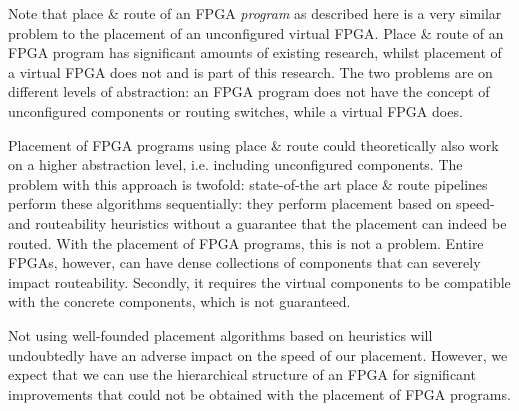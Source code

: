 \begin{minipage}{\textwidth}
\begin{important}
Note that place \& route of an FPGA \textit{program} as described here is a very similar problem to the placement of an unconfigured virtual FPGA. Place \& route of an FPGA program has significant amounts of existing research, whilst placement of a virtual FPGA does not and is part of this research. The two problems are on different levels of abstraction: an FPGA program does not have the concept of unconfigured components or routing switches, while a virtual FPGA does.

Placement of FPGA programs using place \& route could theoretically also work on a higher abstraction level, i.e. including unconfigured components. The problem with this approach is twofold: state-of-the art place \& route pipelines perform these algorithms sequentially: they perform placement based on speed- and routeability heuristics without a guarantee that the placement can indeed be routed\cite{alhyari2019}. With the placement of FPGA programs, this is not a problem. Entire FPGAs, however, can have dense collections of components that can severely impact routeability. Secondly, it requires the virtual components to be compatible with the concrete components, which is not guaranteed.

Not using well-founded placement algorithms based on heuristics will undoubtedly have an adverse impact on the speed of our placement. However, we expect that we can use the hierarchical structure of an FPGA for significant improvements that could not be obtained with the placement of FPGA programs.
\end{important}
\end{minipage}


